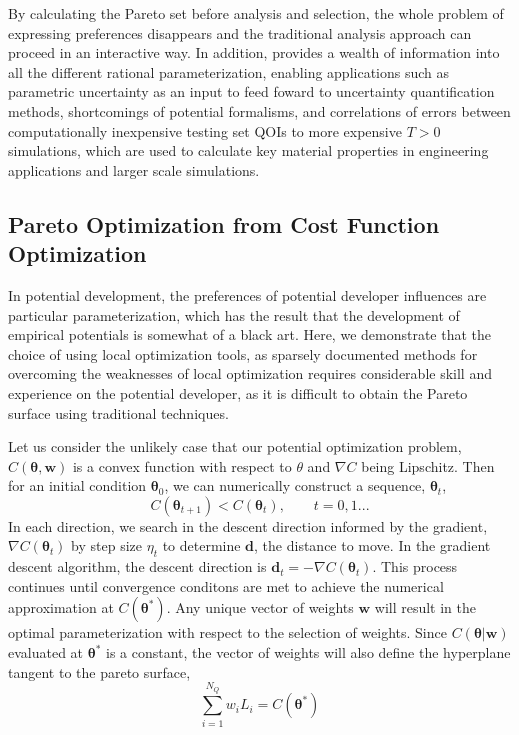 By calculating the Pareto set before analysis and selection, the whole problem of expressing preferences disappears and the traditional analysis approach can proceed in an interactive way.  In addition, provides a wealth of information into all the different rational parameterization, enabling applications such as parametric uncertainty as an input to feed foward to uncertainty quantification methods, shortcomings of potential formalisms, and correlations of errors between computationally inexpensive testing set QOIs to more expensive $T>0$ simulations, which are used to calculate key material properties in engineering applications and larger scale simulations.

\subsection{Pareto Optimization from Cost Function Optimization}

In potential development, the preferences of potential developer influences are particular parameterization, which has the result that the development of empirical potentials is somewhat of a black art.  Here, we demonstrate that the choice of using local optimization tools, as sparsely documented methods for overcoming the weaknesses of local optimization requires considerable skill and experience on the potential developer, as it is difficult to obtain the Pareto surface using traditional techniques.

Let us consider the unlikely case that our potential optimization problem, $C(\bm{\theta},\bm{w})$ is a convex function with respect to $\theta$ and $\nabla C$ being Lipschitz.  Then for an initial condition $\bm{\theta}_0$, we can numerically construct a sequence, ${\bm{\theta}_t}$,
\begin{equation}
	C(\bm{\theta}_{t+1}) < C(\bm{\theta}_{t}), \qquad t = 0,1...
\end{equation}
In each direction, we search in the descent direction informed by the gradient, $\nabla C(\bm{\theta}_t)$ by step size $\eta_t$ to determine $\bm{d}$, the distance to move.  In the gradient descent algorithm, the descent direction is $\bm{d}_t = - \nabla C(\bm{\theta}_t)$.  This process continues until convergence conditons are met to achieve the numerical approximation at $C(\bm{\theta}^*)$.  Any unique vector of weights $\bm{w}$ will result in the optimal parameterization with respect to the selection of weights.  Since $C(\bm{\theta}|\bm{w})$ evaluated at $\bm{\theta}^*$ is a constant, the vector of weights will also define the hyperplane tangent to the pareto surface,
\begin{equation}
	\sum_{i=1}^{N_Q} w_i L_i = C(\bm{\theta}^*)
\end{equation}

